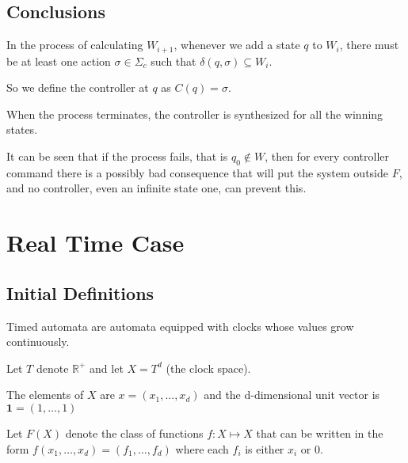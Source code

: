 \documentclass[table]{beamer}
\begin{document}
\subsection{Conclusions}
\begin{frame}
	\justify
	In the process of calculating $W_{i+1}$, whenever we add a state $q$ to $W_i$, 
	there must be at least one action $\sigma \in \Sigma_c$ such that $\delta(q,\sigma) \subseteq W_i$.
	
	\medskip	
	
	So we define the controller at $q$ as $C(q)=\sigma$.
	
	\medskip
	
	When the process terminates, the controller is synthesized for all the winning states.
		
	\medskip
	
	It can be seen that if the process fails, that is $q_0 \not\in W$, then for every controller
	command there is a possibly bad consequence that will put the system outside $F$, 
	and no controller, even an infinite state one, can prevent this.
\end{frame}

\section{Real Time Case}
\subsection{Initial Definitions}
\begin{frame}
	Timed automata are automata equipped with clocks whose values grow continuously.

	\medskip 

	Let $T$ denote $\mathbb{R}^+$ and let $X=T^d$ (the clock space).
	
	\medskip
	
	The elements of $X$ are $x=(x_1,\ldots,x_d)$ and the d-dimensional unit vector is $\textbf{1}=(1,\ldots,1)$ 
	
	\medskip
	
	\begin{dfn}
		Let $F(X)$ denote the class of functions $f:X \mapsto X$ that can be written in the form $f(x_1,\ldots,x_d)=(f_1,\ldots,f_d)$ where each $f_i$ is either $x_i$ or $0$.
	\end{dfn}
	
\end{frame}
\end{document}
